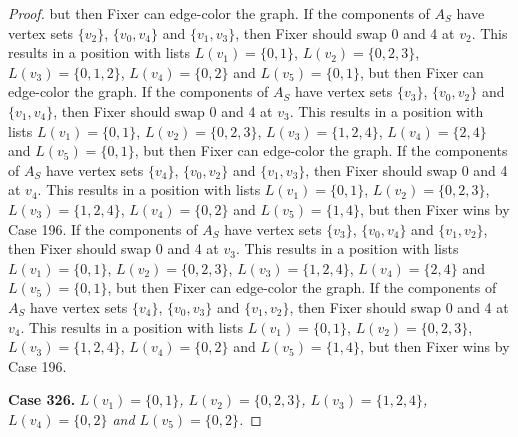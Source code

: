 \documentclass[12pt]{amsart}
\theoremstyle{plain}
\theoremstyle{definition}
\theoremstyle{remark}
\begin{document}
\begin{proof}
but then Fixer can edge-color the graph. If the components of $A_S$ have vertex sets $\{v_2\}$, $\{v_0, v_4\}$ and $\{v_1, v_3\}$, then Fixer should swap 0 and 4 at $v_2$. This results in a position with lists $L(v_1) = \{0, 1\}$, $L(v_2) = \{0, 2, 3\}$, $L(v_3) = \{0, 1, 2\}$, $L(v_4) = \{0, 2\}$ and $L(v_5) = \{0, 1\}$, but then Fixer can edge-color the graph. If the components of $A_S$ have vertex sets $\{v_3\}$, $\{v_0, v_2\}$ and $\{v_1, v_4\}$, then Fixer should swap 0 and 4 at $v_3$. This results in a position with lists $L(v_1) = \{0, 1\}$, $L(v_2) = \{0, 2, 3\}$, $L(v_3) = \{1, 2, 4\}$, $L(v_4) = \{2, 4\}$ and $L(v_5) = \{0, 1\}$, but then Fixer can edge-color the graph. If the components of $A_S$ have vertex sets $\{v_4\}$, $\{v_0, v_2\}$ and $\{v_1, v_3\}$, then Fixer should swap 0 and 4 at $v_4$. This results in a position with lists $L(v_1) = \{0, 1\}$, $L(v_2) = \{0, 2, 3\}$, $L(v_3) = \{1, 2, 4\}$, $L(v_4) = \{0, 2\}$ and $L(v_5) = \{1, 4\}$, but then Fixer wins by Case 196. If the components of $A_S$ have vertex sets $\{v_3\}$, $\{v_0, v_4\}$ and $\{v_1, v_2\}$, then Fixer should swap 0 and 4 at $v_3$. This results in a position with lists $L(v_1) = \{0, 1\}$, $L(v_2) = \{0, 2, 3\}$, $L(v_3) = \{1, 2, 4\}$, $L(v_4) = \{2, 4\}$ and $L(v_5) = \{0, 1\}$, but then Fixer can edge-color the graph. If the components of $A_S$ have vertex sets $\{v_4\}$, $\{v_0, v_3\}$ and $\{v_1, v_2\}$, then Fixer should swap 0 and 4 at $v_4$. This results in a position with lists $L(v_1) = \{0, 1\}$, $L(v_2) = \{0, 2, 3\}$, $L(v_3) = \{1, 2, 4\}$, $L(v_4) = \{0, 2\}$ and $L(v_5) = \{1, 4\}$, but then Fixer wins by Case 196. 

\noindent\textbf{Case 326.  }\textit{$L(v_1) = \{0, 1\}$, $L(v_2) = \{0, 2, 3\}$, $L(v_3) = \{1, 2, 4\}$, $L(v_4) = \{0, 2\}$ and $L(v_5) = \{0, 2\}$.}


\end{proof}
\end{document}
